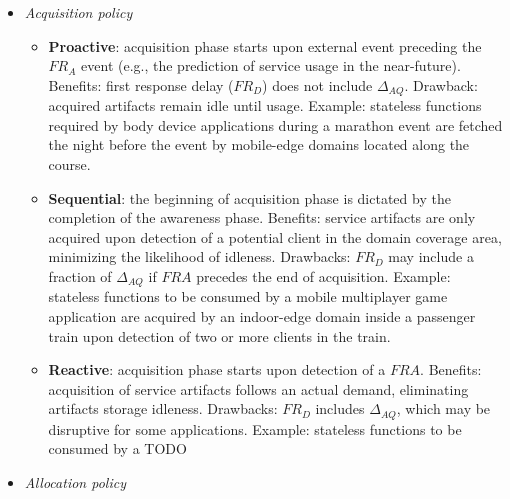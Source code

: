 \begin{itemize}
	
\item \textit{Acquisition policy}

\begin{itemize}

\item \textbf{Proactive}: acquisition phase starts upon external event preceding the $FR_A$ event (e.g., the prediction of service usage in the near-future). Benefits: first response delay ($FR_D$) does not include $\Delta_{AQ}$. Drawback: acquired artifacts remain idle until usage. Example: stateless functions required by body device applications during a marathon event are fetched the night before the event by mobile-edge domains located along the course. 

\item \textbf{Sequential}: the beginning of acquisition phase is dictated by the completion of the awareness phase. Benefits: service artifacts are only acquired upon detection of a potential client in the domain coverage area, minimizing the likelihood of idleness. Drawbacks: $FR_D$ may include a fraction of $\Delta_{AQ}$ if $FRA$ precedes the end of acquisition. Example: stateless functions to be consumed by a mobile multiplayer game application are acquired by an indoor-edge domain inside a passenger train upon detection of two or more clients in the train.

\item \textbf{Reactive}: acquisition phase starts upon detection of a $FRA$. Benefits: acquisition of service artifacts follows an actual demand, eliminating artifacts storage idleness. Drawbacks: $FR_D$ includes $\Delta_{AQ}$, which may be disruptive for some applications. Example: stateless functions to be consumed by a TODO 


\end{itemize}

\item \textit{Allocation policy}


\begin{itemize}


\end{itemize}
\end{itemize}
